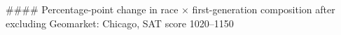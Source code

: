 #### Percentage-point change in race × first-generation composition after excluding Geomarket: Chicago, SAT score 1020–1150
